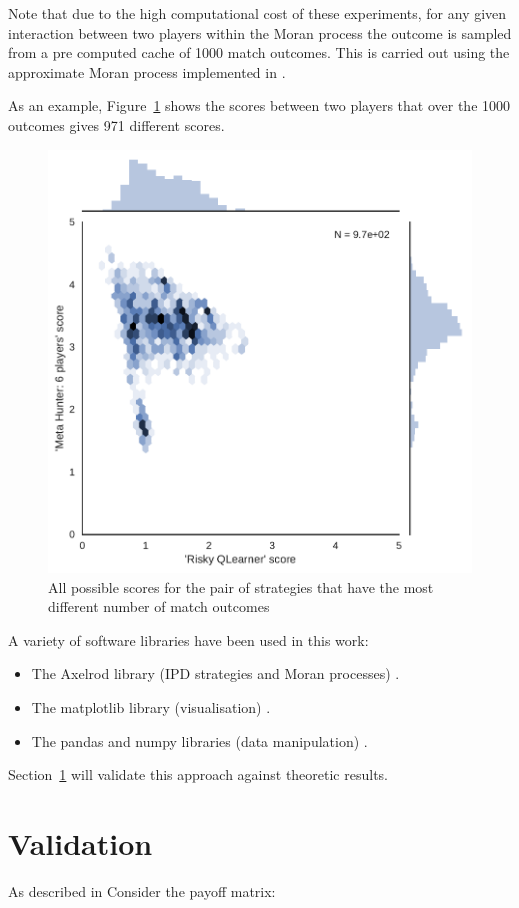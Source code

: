 \documentclass{article}
\begin{document}
Note that due to the high computational cost of these experiments, for any given
interaction between two players within the Moran process the outcome is sampled
from a pre computed cache of 1000 match outcomes. This is carried out using the
approximate Moran process implemented in \cite{axelrodproject}.

As an example, Figure~\ref{fig:players_with_most_scores} shows the scores
between two players that over the 1000 outcomes gives 971 different scores.

\begin{figure}[!htbp]
    \centering
    \includegraphics[width=.4\textwidth]{../img/players_with_most_scores.pdf}
    \caption{All possible scores for the pair of strategies that have the most
    different number of match outcomes}
    \label{fig:players_with_most_scores}
\end{figure}

A variety of software libraries have been used in this work:

\begin{itemize}
    \item The Axelrod library (IPD strategies and Moran processes)
        \cite{axelrodproject}.
    \item The matplotlib library (visualisation) \cite{hunter2007matplotlib}.
    \item The pandas and numpy libraries (data manipulation)
        \cite{mckinney2010data, walt2011numpy}.
\end{itemize}

Section~\ref{sec:validation} will validate this approach against theoretic
results.

\section{Validation}\label{sec:validation}

As described in \cite{Nowak} Consider the payoff matrix:
\end{document}
